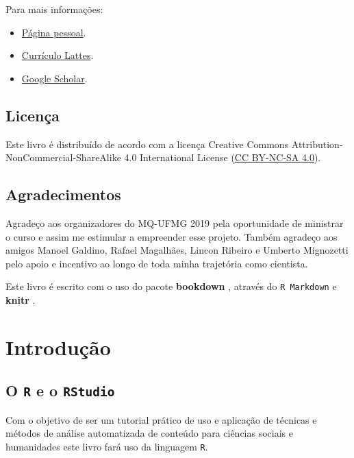 \documentclass[]{book}
\begin{document}
Para mais informações:

\begin{itemize}
\item
  \href{https://davimoreira.com/}{Página pessoal}.
\item
  \href{http://lattes.cnpq.br/7406586493977047}{Currículo Lattes}.
\item
  \href{https://scholar.google.com.br/citations?hl=pt-BR\&user=dS9bbdMAAAAJ}{Google Scholar}.
\end{itemize}

\hypertarget{licenuxe7a}{%
\section*{Licença}\label{licenuxe7a}}

Este livro é distribuído de acordo com a licença Creative Commons Attribution-NonCommercial-ShareAlike 4.0 International License (\href{https://creativecommons.org/licenses/by-nc-sa/4.0/}{CC BY-NC-SA 4.0}).

\hypertarget{agradecimentos}{%
\section*{Agradecimentos}\label{agradecimentos}}

Agradeço aos organizadores do MQ-UFMG 2019 pela oportunidade de ministrar o curso e assim me estimular a empreender esse projeto. Também agradeço aos amigos Manoel Galdino, Rafael Magalhães, Lincon Ribeiro e Umberto Mignozetti pelo apoio e incentivo ao longo de toda minha trajetória como cientista.

Este livro é escrito com o uso do pacote \textbf{bookdown} \citep{R-bookdown}, através do \texttt{R\ Markdown} e \textbf{knitr} \citep{xie2015}.

\hypertarget{intro}{%
\chapter{Introdução}\label{intro}}

\hypertarget{o-r-e-o-rstudio}{%
\section{\texorpdfstring{O \texttt{R} e o \texttt{RStudio}}{O R e o RStudio}}\label{o-r-e-o-rstudio}}

Com o objetivo de ser um tutorial prático de uso e aplicação de técnicas e métodos de análise automatizada de conteúdo para ciências sociais e humanidades este livro fará uso da linguagem \texttt{R}.
\end{document}
